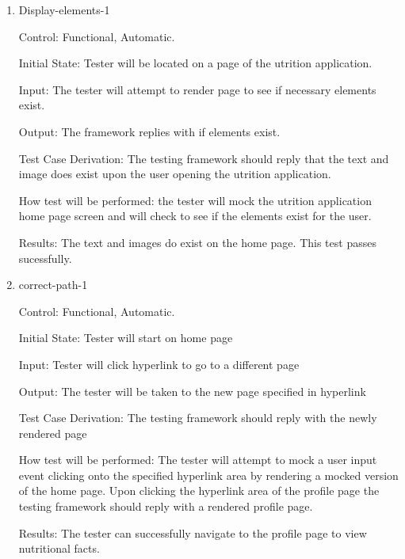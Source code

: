 \documentclass[12pt, titlepage]{article}
\begin{document}
	\begin{enumerate}
		\item{Display-elements-1\\}
		
		Control: Functional, Automatic.
		
		Initial State: Tester will be located on a page of the utrition application.
		
		Input: The tester will attempt to render page to see if necessary elements exist.
		
		Output: The framework replies with if elements exist.
		
		Test Case Derivation: The testing framework should reply that the text and image does exist upon the user opening the utrition application.
		
		How test will be performed: the tester will mock the utrition application home page screen and will check to see if the elements exist for the user.

		Results: The text and images do exist on the home page. This test passes sucessfully.

		\item{correct-path-1\\}
		
		Control: Functional, Automatic.
		
		Initial State: Tester will start on home page
		
		Input: Tester will click hyperlink to go to a different page
		
		Output: The tester will be taken to the new page specified in hyperlink
		
		Test Case Derivation: The testing framework should reply with the newly rendered page
		
		How test will be performed: The tester will attempt to mock a user input event clicking onto the specified hyperlink area by rendering a mocked version of the home page. Upon clicking the hyperlink area of the profile page the testing framework should reply with a rendered profile page.

		Results: The tester can successfully navigate to the profile page to view nutritional facts.

	\end{enumerate}
\end{document}
